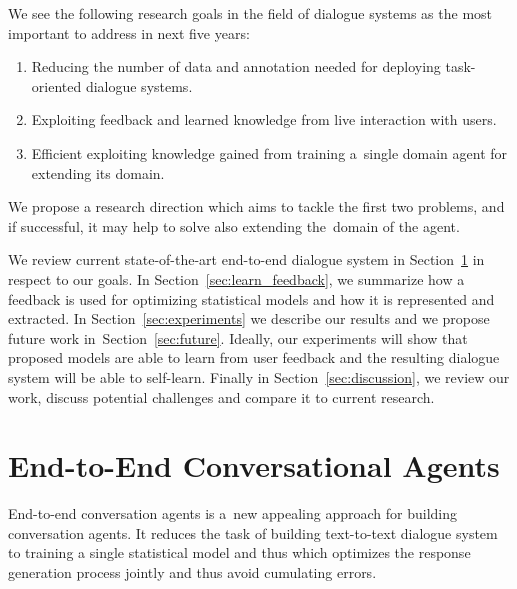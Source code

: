\documentclass[11pt]{article}
\begin{document}
We see the following research goals in the field of dialogue systems as the most important to address in next five years:
\begin{enumerate}
    \item Reducing the number of data and annotation needed for deploying task-oriented dialogue systems.
    \item Exploiting feedback and learned knowledge from live interaction with users.
    \item Efficient exploiting knowledge gained from training a~single domain agent for extending its domain. 
\end{enumerate}


We propose a research direction which aims to tackle the first two problems, and if successful, it may help to solve also extending the~domain of the agent.

We review current state-of-the-art end-to-end dialogue system in Section~\ref{sec:e2end} in respect to our goals.
In Section~\ref{sec:learn_feedback}, we summarize how a feedback is used for optimizing statistical models and how it is represented and extracted. 
In Section~\ref{sec:experiments} we describe our results and we propose future work in~Section~\ref{sec:future}. 
Ideally, our experiments will show that proposed models are able to learn from user feedback and the resulting dialogue system will be able to self-learn.
Finally in Section~\ref{sec:discussion}, we review our work, discuss potential challenges and compare it to current research.


\section{End-to-End Conversational Agents}
\label{sec:e2end}
End-to-end conversation agents is a~new appealing approach for building conversation agents.
It reduces the task of building text-to-text dialogue system to training a single statistical model and thus which optimizes the response generation process jointly and thus avoid cumulating errors.
\end{document}
